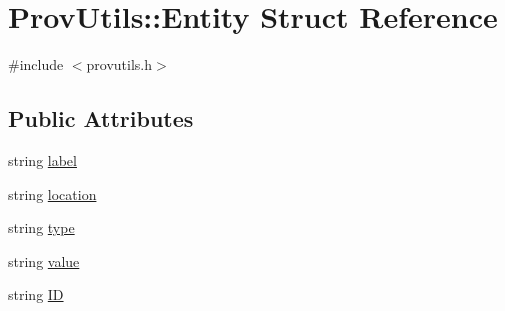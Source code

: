 \hypertarget{struct_prov_utils_1_1_entity}{\section{Prov\-Utils\-:\-:Entity Struct Reference}
\label{struct_prov_utils_1_1_entity}
}


{\ttfamily \#include $<$provutils.\-h$>$}

\subsection*{Public Attributes}
\begin{DoxyCompactItemize}
\item 
string \hyperlink{struct_prov_utils_1_1_entity_a1da24da5a6989c2ac22f5fd3464ffbc2}{label}
\item 
string \hyperlink{struct_prov_utils_1_1_entity_ac2670e0260f3ff358475f9758af9eafe}{location}
\item 
string \hyperlink{struct_prov_utils_1_1_entity_aaf7eb08fca6dddb2534ff34124a9b69c}{type}
\item 
string \hyperlink{struct_prov_utils_1_1_entity_ad2f99bb0a93f48d801f9f425ecedfcce}{value}
\item 
string \hyperlink{struct_prov_utils_1_1_entity_adbf2382ee1ccd90946c2dd78071a5593}{I\-D}
\end{DoxyCompactItemize}


